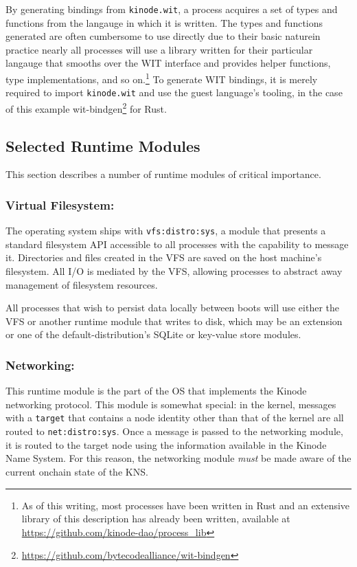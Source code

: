 \documentclass[runningheads]{llncs}
\begin{document}
By generating bindings from \verb|kinode.wit|, a process acquires a set of types and functions from the langauge in which it is written.
The types and functions generated are often cumbersome to use directly due to their basic nature\textemdash in practice nearly all processes will use a library written for their particular langauge that smooths over the WIT interface and provides helper functions, type implementations, and so on.\footnote{ As of this writing, most processes have been written in Rust and an extensive library of this description has already been written, available at \url{https://github.com/kinode-dao/process\_lib} }
To generate WIT bindings, it is merely required to import \verb|kinode.wit| and use the guest language's tooling, in the case of this example wit-bindgen\footnote{\url{https://github.com/bytecodealliance/wit-bindgen}} for Rust.

\subsection{Selected Runtime Modules}
\label{sec:osmodules}

This section describes a number of runtime modules of critical importance.

\subsubsection{Virtual Filesystem:}
\label{sec:osvfs}

The operating system ships with \verb|vfs:distro:sys|, a module that presents a standard filesystem API accessible to all processes with the capability to message it.
Directories and files created in the VFS are saved on the host machine's filesystem.
All I/O is mediated by the VFS, allowing processes to abstract away management of filesystem resources.

All processes that wish to persist data locally between boots will use either the VFS or another runtime module that writes to disk, which may be an extension or one of the default-distribution's SQLite or key-value store modules.

\subsubsection{Networking:}
\label{sec:osnetworking}

This runtime module is the part of the OS that implements the Kinode networking protocol.
This module is somewhat special: in the kernel, messages with a \verb|target| that contains a node identity other than that of the kernel are all routed to \verb|net:distro:sys|.
Once a message is passed to the networking module, it is routed to the target node using the information available in the Kinode Name System.
For this reason, the networking module \textit{must} be made aware of the current onchain state of the KNS.
\end{document}
